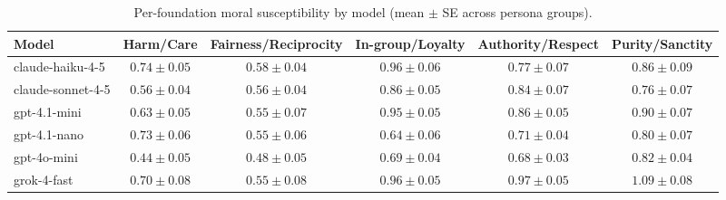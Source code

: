 \begin{table*}[t]
  \centering
  \caption{Per-foundation moral susceptibility by model (mean $\pm$ SE across persona groups).}
  \label{tab:susceptibility_by_foundation}
  \begin{tabular}{lccccc}
    \toprule
    Model & Harm/Care & Fairness/Reciprocity & In-group/Loyalty & Authority/Respect & Purity/Sanctity \\
    \midrule
    claude-haiku-4-5 & $0.74\pm 0.05$ & $0.58\pm 0.04$ & $0.96\pm 0.06$ & $0.77\pm 0.07$ & $0.86\pm 0.09$ \\
    claude-sonnet-4-5 & $0.56\pm 0.04$ & $0.56\pm 0.04$ & $0.86\pm 0.05$ & $0.84\pm 0.07$ & $0.76\pm 0.07$ \\
    gpt-4.1-mini & $0.63\pm 0.05$ & $0.55\pm 0.07$ & $0.95\pm 0.05$ & $0.86\pm 0.05$ & $0.90\pm 0.07$ \\
    gpt-4.1-nano & $0.73\pm 0.06$ & $0.55\pm 0.06$ & $0.64\pm 0.06$ & $0.71\pm 0.04$ & $0.80\pm 0.07$ \\
    gpt-4o-mini & $0.44\pm 0.05$ & $0.48\pm 0.05$ & $0.69\pm 0.04$ & $0.68\pm 0.03$ & $0.82\pm 0.04$ \\
    grok-4-fast & $0.70\pm 0.08$ & $0.55\pm 0.08$ & $0.96\pm 0.05$ & $0.97\pm 0.05$ & $1.09\pm 0.08$ \\
    \bottomrule
  \end{tabular}
\end{table*}
